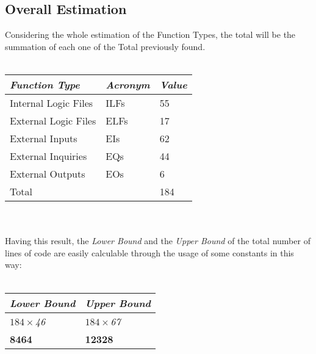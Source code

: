 \documentclass[11pt,a4paper]{report}
\begin{document}
\subsection{Overall Estimation}
Considering the whole estimation of the Function Types, the total will be the summation of each one of the Total previously found. 
\\\\
\begin{tabularx}{\textwidth}{|X|X|X|}
	\hline
	\textit{Function Type} & \textit{Acronym} & \textit{Value}\\
	\hline
	Internal Logic Files & ILFs & 55\\
	\hline
	External Logic Files & ELFs & 17\\
	\hline
	External Inputs & EIs & 62\\
	\hline
	External Inquiries & EQs & 44\\
	\hline
	External Outputs & EOs & 6\\
	\hline
	\hline
	Total & \multicolumn{1}{X}{} & \multicolumn{1}{X|}{184}\\
	\hline
\end{tabularx}
\\\\
Having this result, the \textit{Lower Bound} and the \textit{Upper Bound} of the total number of lines of code are easily calculable through the usage of some constants in this way:
\\\\
\begin{tabularx}{\textwidth}{|X|X|}
	\hline
	\textit{Lower Bound} & \textit{Upper Bound}\\
	\hline
	\textit{$184\times$46} & \textit{$184\times$67}\\
	\hline
	\textbf{8464} & \textbf{12328}\\
	\hline
\end{tabularx}
\newpage
\end{document}
